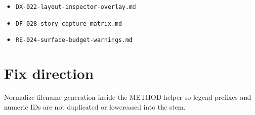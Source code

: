 \begin{itemize}
\tightlist
\item
  \texttt{D\allowbreak{}X\allowbreak{}-\allowbreak{}0\allowbreak{}2\allowbreak{}2\allowbreak{}-\allowbreak{}l\allowbreak{}a\allowbreak{}y\allowbreak{}o\allowbreak{}u\allowbreak{}t\allowbreak{}-\allowbreak{}i\allowbreak{}n\allowbreak{}s\allowbreak{}p\allowbreak{}e\allowbreak{}c\allowbreak{}t\allowbreak{}o\allowbreak{}r\allowbreak{}-\allowbreak{}o\allowbreak{}v\allowbreak{}e\allowbreak{}r\allowbreak{}l\allowbreak{}a\allowbreak{}y\allowbreak{}.\allowbreak{}m\allowbreak{}d}
\item
  \texttt{D\allowbreak{}F\allowbreak{}-\allowbreak{}0\allowbreak{}2\allowbreak{}8\allowbreak{}-\allowbreak{}s\allowbreak{}t\allowbreak{}o\allowbreak{}r\allowbreak{}y\allowbreak{}-\allowbreak{}c\allowbreak{}a\allowbreak{}p\allowbreak{}t\allowbreak{}u\allowbreak{}r\allowbreak{}e\allowbreak{}-\allowbreak{}m\allowbreak{}a\allowbreak{}t\allowbreak{}r\allowbreak{}i\allowbreak{}x\allowbreak{}.\allowbreak{}m\allowbreak{}d}
\item
  \texttt{R\allowbreak{}E\allowbreak{}-\allowbreak{}0\allowbreak{}2\allowbreak{}4\allowbreak{}-\allowbreak{}s\allowbreak{}u\allowbreak{}r\allowbreak{}f\allowbreak{}a\allowbreak{}c\allowbreak{}e\allowbreak{}-\allowbreak{}b\allowbreak{}u\allowbreak{}d\allowbreak{}g\allowbreak{}e\allowbreak{}t\allowbreak{}-\allowbreak{}w\allowbreak{}a\allowbreak{}r\allowbreak{}n\allowbreak{}i\allowbreak{}n\allowbreak{}g\allowbreak{}s\allowbreak{}.\allowbreak{}m\allowbreak{}d}
\end{itemize}

\section{Fix direction}\label{record-406-fix-direction}

Normalize filename generation inside the METHOD helper so legend prefixes and numeric IDs are not duplicated or lowercased into the stem.

